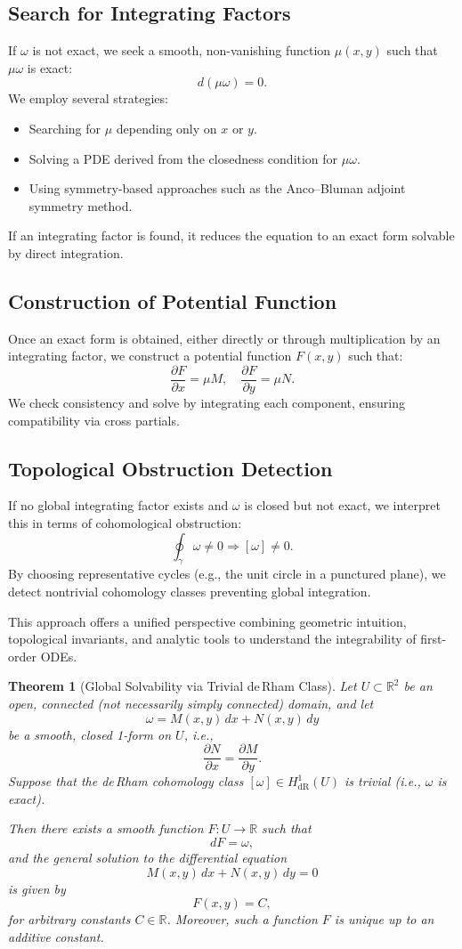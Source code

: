 \documentclass{amsart}
\newtheorem{theorem}{Theorem}[section]
\theoremstyle{definition}
\theoremstyle{remark}
\numberwithin{equation}{section}
\begin{document}
\subsection{Search for Integrating Factors}
If $\omega$ is not exact, we seek a smooth, non-vanishing function $\mu(x, y)$ such that $\mu \omega$ is exact:
\[
d(\mu \omega) = 0.
\]
We employ several strategies:
\begin{itemize}
    \item Searching for $\mu$ depending only on $x$ or $y$.
    \item Solving a PDE derived from the closedness condition for $\mu \omega$.
    \item Using symmetry-based approaches such as the Anco–Bluman adjoint symmetry method.
\end{itemize}
If an integrating factor is found, it reduces the equation to an exact form solvable by direct integration.

\subsection{Construction of Potential Function}
Once an exact form is obtained, either directly or through multiplication by an integrating factor, we construct a potential function $F(x, y)$ such that:
\[
\frac{\partial F}{\partial x} = \mu M, \quad \frac{\partial F}{\partial y} = \mu N.
\]
We check consistency and solve by integrating each component, ensuring compatibility via cross partials.

\subsection{Topological Obstruction Detection}
If no global integrating factor exists and $\omega$ is closed but not exact, we interpret this in terms of cohomological obstruction:
\[
\oint_\gamma \omega \neq 0 \Rightarrow [\omega] \neq 0.
\]
By choosing representative cycles (e.g., the unit circle in a punctured plane), we detect nontrivial cohomology classes preventing global integration.

This approach offers a unified perspective combining geometric intuition, topological invariants, and analytic tools to understand the integrability of first-order ODEs.
\begin{theorem}[Global Solvability via Trivial de\,Rham Class]
Let \( U \subset \mathbb{R}^2 \) be an open, connected (not necessarily simply connected) domain, and let
\[
\omega = M(x, y)\, dx + N(x, y)\, dy
\]
be a smooth, closed 1-form on \( U \), i.e.,
\[
\frac{\partial N}{\partial x} = \frac{\partial M}{\partial y}.
\]
Suppose that the de\,Rham cohomology class \( [\omega] \in H^1_{\mathrm{dR}}(U) \) is trivial (i.e., \( \omega \) is exact).

Then there exists a smooth function \( F : U \to \mathbb{R} \) such that
\[
dF = \omega,
\]
and the general solution to the differential equation
\[
M(x, y)\, dx + N(x, y)\, dy = 0
\]
is given by
\[
F(x, y) = C,
\]
for arbitrary constants \( C \in \mathbb{R} \). Moreover, such a function \( F \) is unique up to an additive constant.
\end{theorem}
\end{document}
